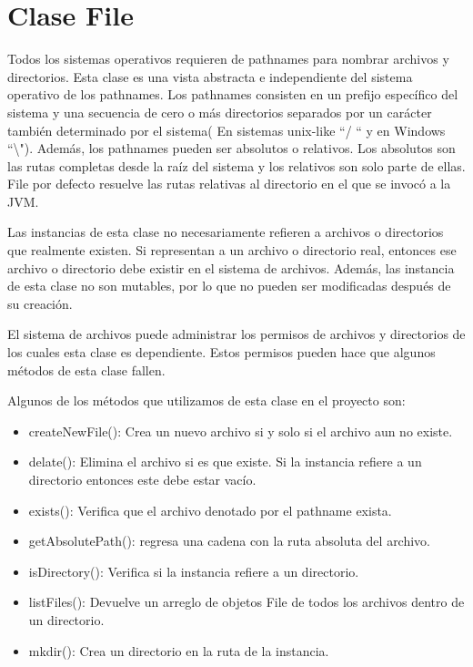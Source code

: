 \documentclass[11pt]{article}
\begin{document}
\section{Clase File}
Todos los sistemas operativos requieren de pathnames para nombrar archivos y directorios. Esta clase es una vista abstracta e independiente del sistema operativo de los pathnames. Los pathnames consisten en un prefijo específico del sistema y una secuencia de cero o más directorios separados por un carácter también determinado por el sistema( En sistemas unix-like ``/ `` y en Windows ``\textbackslash"). Además, los pathnames pueden ser absolutos o relativos. Los absolutos son las rutas completas desde la raíz del sistema y los relativos son solo parte de ellas. File por defecto resuelve las rutas relativas al directorio en el que se invocó a la JVM.  
\par
Las instancias de esta clase no necesariamente refieren a archivos o directorios que realmente existen. Si representan a un archivo o directorio real, entonces ese archivo o directorio debe existir en el sistema de archivos. Además, las instancia de esta clase no son mutables, por lo que no pueden ser modificadas después de su creación.
\par 
El sistema de archivos puede administrar los permisos de archivos y directorios de los cuales esta clase es dependiente. Estos permisos pueden hace que algunos métodos de esta clase fallen. 

Algunos de los métodos que utilizamos de esta clase en el proyecto son:

\begin{itemize}
\item createNewFile(): Crea un nuevo archivo si y solo si el archivo aun no existe.
\item delate(): Elimina el archivo si es que existe. Si la instancia refiere a un directorio entonces este debe estar vacío.
\item exists(): Verifica que el archivo denotado por el pathname exista.
\item getAbsolutePath(): regresa una cadena con la ruta absoluta del archivo.
\item isDirectory(): Verifica si la instancia refiere a un directorio.
\item listFiles(): Devuelve un arreglo de objetos File de todos los archivos dentro de un directorio.
\item mkdir(): Crea un directorio en la ruta de la instancia.

\end{itemize}
\end{document}
